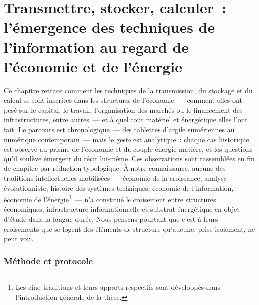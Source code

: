\makeatletter
{}
\makeatother

\chapter[Transmettre, stocker, calculer]{Transmettre, stocker, calculer~: l'émergence des techniques de l'information au regard de l'économie et de l'énergie}\label{ch:history}

Ce chapitre retrace comment les techniques de la transmission, du stockage et du calcul se sont inscrites dans les structures de l'économie~--- comment elles ont pesé sur le capital, le travail, l'organisation des marchés ou le financement des infrastructures, entre autres~--- et à quel coût matériel et énergétique elles l'ont fait. Le parcours est chronologique~--- des tablettes d'argile sumériennes au numérique contemporain~--- mais le geste est analytique~: chaque cas historique est observé au prisme de l'économie et du couple énergie-matière, et les questions qu'il soulève émergent du récit lui-même. Ces observations sont rassemblées en fin de chapitre par réduction typologique. À notre connaissance, aucune des traditions intellectuelles mobilisées~--- économie de la croissance, analyse évolutionniste, histoire des systèmes techniques, économie de l'information, économie de l'énergie\footnote{Les cinq traditions et leurs apports respectifs sont développés dans l'introduction générale de la thèse.}~--- n'a constitué le croisement entre structures économiques, infrastructure informationnelle et substrat énergétique en objet d'étude dans la longue durée. Nous pensons pourtant que c'est à leurs croisements que se logent des éléments de structure qu'aucune, prise isolément, ne peut voir.




\subsection*{Méthode et protocole}\label{subsec:grammaire}

